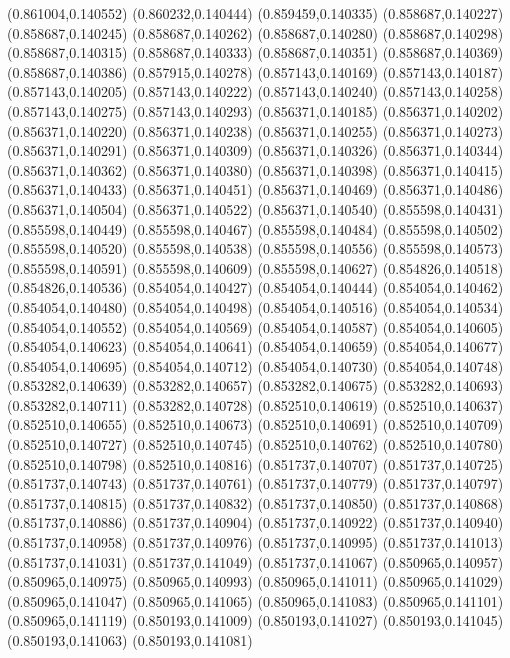 (0.861004,0.140552)
(0.860232,0.140444)
(0.859459,0.140335)
(0.858687,0.140227)
(0.858687,0.140245)
(0.858687,0.140262)
(0.858687,0.140280)
(0.858687,0.140298)
(0.858687,0.140315)
(0.858687,0.140333)
(0.858687,0.140351)
(0.858687,0.140369)
(0.858687,0.140386)
(0.857915,0.140278)
(0.857143,0.140169)
(0.857143,0.140187)
(0.857143,0.140205)
(0.857143,0.140222)
(0.857143,0.140240)
(0.857143,0.140258)
(0.857143,0.140275)
(0.857143,0.140293)
(0.856371,0.140185)
(0.856371,0.140202)
(0.856371,0.140220)
(0.856371,0.140238)
(0.856371,0.140255)
(0.856371,0.140273)
(0.856371,0.140291)
(0.856371,0.140309)
(0.856371,0.140326)
(0.856371,0.140344)
(0.856371,0.140362)
(0.856371,0.140380)
(0.856371,0.140398)
(0.856371,0.140415)
(0.856371,0.140433)
(0.856371,0.140451)
(0.856371,0.140469)
(0.856371,0.140486)
(0.856371,0.140504)
(0.856371,0.140522)
(0.856371,0.140540)
(0.855598,0.140431)
(0.855598,0.140449)
(0.855598,0.140467)
(0.855598,0.140484)
(0.855598,0.140502)
(0.855598,0.140520)
(0.855598,0.140538)
(0.855598,0.140556)
(0.855598,0.140573)
(0.855598,0.140591)
(0.855598,0.140609)
(0.855598,0.140627)
(0.854826,0.140518)
(0.854826,0.140536)
(0.854054,0.140427)
(0.854054,0.140444)
(0.854054,0.140462)
(0.854054,0.140480)
(0.854054,0.140498)
(0.854054,0.140516)
(0.854054,0.140534)
(0.854054,0.140552)
(0.854054,0.140569)
(0.854054,0.140587)
(0.854054,0.140605)
(0.854054,0.140623)
(0.854054,0.140641)
(0.854054,0.140659)
(0.854054,0.140677)
(0.854054,0.140695)
(0.854054,0.140712)
(0.854054,0.140730)
(0.854054,0.140748)
(0.853282,0.140639)
(0.853282,0.140657)
(0.853282,0.140675)
(0.853282,0.140693)
(0.853282,0.140711)
(0.853282,0.140728)
(0.852510,0.140619)
(0.852510,0.140637)
(0.852510,0.140655)
(0.852510,0.140673)
(0.852510,0.140691)
(0.852510,0.140709)
(0.852510,0.140727)
(0.852510,0.140745)
(0.852510,0.140762)
(0.852510,0.140780)
(0.852510,0.140798)
(0.852510,0.140816)
(0.851737,0.140707)
(0.851737,0.140725)
(0.851737,0.140743)
(0.851737,0.140761)
(0.851737,0.140779)
(0.851737,0.140797)
(0.851737,0.140815)
(0.851737,0.140832)
(0.851737,0.140850)
(0.851737,0.140868)
(0.851737,0.140886)
(0.851737,0.140904)
(0.851737,0.140922)
(0.851737,0.140940)
(0.851737,0.140958)
(0.851737,0.140976)
(0.851737,0.140995)
(0.851737,0.141013)
(0.851737,0.141031)
(0.851737,0.141049)
(0.851737,0.141067)
(0.850965,0.140957)
(0.850965,0.140975)
(0.850965,0.140993)
(0.850965,0.141011)
(0.850965,0.141029)
(0.850965,0.141047)
(0.850965,0.141065)
(0.850965,0.141083)
(0.850965,0.141101)
(0.850965,0.141119)
(0.850193,0.141009)
(0.850193,0.141027)
(0.850193,0.141045)
(0.850193,0.141063)
(0.850193,0.141081)
